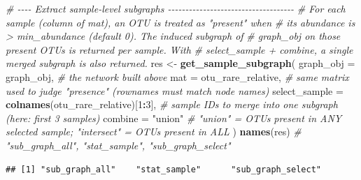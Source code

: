 \documentclass[
]{book}
\newenvironment{Shaded}{\begin{snugshade}}{\end{snugshade}}
\newcommand{\AttributeTok}[1]{\textcolor[rgb]{0.13,0.29,0.53}{#1}}
\newcommand{\CommentTok}[1]{\textcolor[rgb]{0.56,0.35,0.01}{\textit{#1}}}
\newcommand{\DecValTok}[1]{\textcolor[rgb]{0.00,0.00,0.81}{#1}}
\newcommand{\FunctionTok}[1]{\textcolor[rgb]{0.13,0.29,0.53}{\textbf{#1}}}
\newcommand{\NormalTok}[1]{#1}
\newcommand{\OtherTok}[1]{\textcolor[rgb]{0.56,0.35,0.01}{#1}}
\newcommand{\SpecialCharTok}[1]{\textcolor[rgb]{0.81,0.36,0.00}{\textbf{#1}}}
\newcommand{\StringTok}[1]{\textcolor[rgb]{0.31,0.60,0.02}{#1}}
\begin{document}
\begin{Shaded}
\begin{Highlighting}[]
\CommentTok{\# {-}{-}{-}{-} Extract sample{-}level subgraphs {-}{-}{-}{-}{-}{-}{-}{-}{-}{-}{-}{-}{-}{-}{-}{-}{-}{-}{-}{-}{-}{-}{-}{-}{-}{-}{-}{-}{-}{-}{-}{-}{-}{-}{-}{-}}
\CommentTok{\# For each sample (column of \textasciigrave{}mat\textasciigrave{}), an OTU is treated as "present" when}
\CommentTok{\# its abundance is \textgreater{} \textasciigrave{}min\_abundance\textasciigrave{} (default 0). The induced subgraph of}
\CommentTok{\# \textasciigrave{}graph\_obj\textasciigrave{} on those present OTUs is returned per sample. With}
\CommentTok{\# \textasciigrave{}select\_sample\textasciigrave{} + \textasciigrave{}combine\textasciigrave{}, a single merged subgraph is also returned.}
\NormalTok{res }\OtherTok{\textless{}{-}} \FunctionTok{get\_sample\_subgraph}\NormalTok{(}
  \AttributeTok{graph\_obj     =}\NormalTok{ graph\_obj,                        }\CommentTok{\# the network built above}
  \AttributeTok{mat           =}\NormalTok{ otu\_rare\_relative,                }\CommentTok{\# same matrix used to judge "presence" (rownames must match node names)}
  \AttributeTok{select\_sample =} \FunctionTok{colnames}\NormalTok{(otu\_rare\_relative)[}\DecValTok{1}\SpecialCharTok{:}\DecValTok{3}\NormalTok{], }\CommentTok{\# sample IDs to merge into one subgraph (here: first 3 samples)}
  \AttributeTok{combine       =} \StringTok{"union"}                           \CommentTok{\# "union" = OTUs present in ANY selected sample; "intersect" = OTUs present in ALL}
\NormalTok{)}
\FunctionTok{names}\NormalTok{(res)   }\CommentTok{\# "sub\_graph\_all", "stat\_sample", "sub\_graph\_select"}
\end{Highlighting}
\end{Shaded}

\begin{verbatim}
## [1] "sub_graph_all"    "stat_sample"      "sub_graph_select"
\end{verbatim}

\begin{Shaded}
\end{Shaded}
\end{document}
